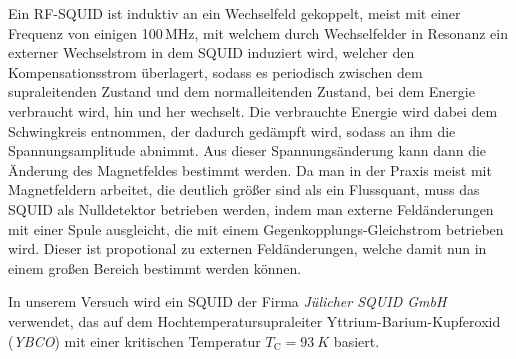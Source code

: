 \documentclass[a4paper,ngerman]{scrartcl}
\begin{document}
Ein RF-SQUID ist induktiv an ein Wechselfeld gekoppelt, 
meist mit einer Frequenz von einigen 100\,MHz,
mit welchem durch Wechselfelder in Resonanz ein externer Wechselstrom in dem SQUID induziert wird, welcher den Kompensationsstrom überlagert, sodass es periodisch zwischen dem supraleitenden Zustand und dem normalleitenden Zustand, bei dem Energie verbraucht wird, 
hin und her wechselt. 
Die verbrauchte Energie wird dabei dem Schwingkreis entnommen,
der dadurch gedämpft wird, sodass an ihm die Spannungsamplitude abnimmt. 
Aus dieser Spannungsänderung kann dann die Änderung des Magnetfeldes bestimmt werden.
Da man in der Praxis meist mit Magnetfeldern arbeitet, 
die deutlich größer sind als ein Flussquant, 
muss das SQUID als Nulldetektor betrieben werden,
indem man externe Feldänderungen mit einer Spule ausgleicht,
die mit einem Gegenkopplungs-Gleichstrom betrieben wird. 
Dieser ist propotional zu externen Feldänderungen, welche damit nun in einem großen Bereich bestimmt werden können.


In unserem Versuch wird ein 
SQUID der Firma \emph{Jülicher SQUID GmbH} verwendet,
das auf dem Hochtemperatursupraleiter
Yttrium-Barium-Kupferoxid (\emph{YBCO}) mit einer kritischen
Temperatur $T_\mathrm{C} = \SI{93}{K}$ basiert.






\end{document}
